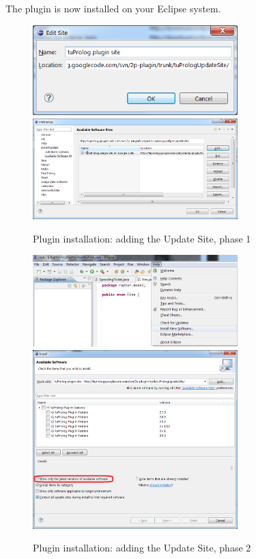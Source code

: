 The \tuprolog{} plugin is now installed on your Eclipse system.

\begin{figure}
\centering
  \includegraphics[width=300px]{images/tuPrologPluginInstall-1.png}\\
  \includegraphics[width=300px]{images/tuPrologPluginInstall-2.png}
  \caption{Plugin installation: adding the Update Site, phase 1}\label{fig:tuPrologPluginInstall-12}
\end{figure}

\begin{figure}
\centering
  \includegraphics[width=300px]{images/tuPrologPluginInstall-3.png}\\
  \includegraphics[width=300px]{images/tuPrologPluginInstall-4.png}
  \caption{Plugin installation: adding the Update Site, phase 2}\label{fig:tuPrologPluginInstall-34}
\end{figure}

